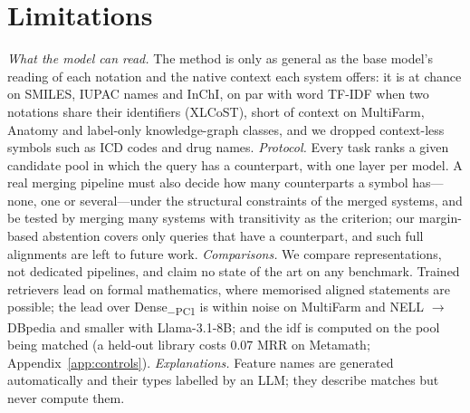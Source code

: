 \documentclass[11pt]{article}
\newcommand{\pcone}{Dense\textsubscript{$-$PC1}\xspace}
\begin{document}
\section{Limitations}
\label{sec:limitations}

\emph{What the model can read.} The method is only as general as the base model's reading of each notation and the native context each system offers: it is at chance on SMILES, IUPAC names and InChI, on par with word TF-IDF when two notations share their identifiers (XLCoST), short of context on MultiFarm, Anatomy and label-only knowledge-graph classes, and we dropped context-less symbols such as ICD codes and drug names.
\emph{Protocol.} Every task ranks a given candidate pool in which the query has a counterpart, with one layer per model. A real merging pipeline must also decide how many counterparts a symbol has---none, one or several---under the structural constraints of the merged systems, and be tested by merging many systems with transitivity as the criterion; our margin-based abstention covers only queries that have a counterpart, and such full alignments are left to future work.
\emph{Comparisons.} We compare representations, not dedicated pipelines, and claim no state of the art on any benchmark. Trained retrievers lead on formal mathematics, where memorised aligned statements are possible; the lead over \pcone is within noise on MultiFarm and NELL $\to$ DBpedia and smaller with Llama-3.1-8B; and the idf is computed on the pool being matched (a held-out library costs 0.07 MRR on Metamath; Appendix~\ref{app:controls}).
\emph{Explanations.} Feature names are generated automatically and their types labelled by an LLM; they describe matches but never compute them.
\end{document}
